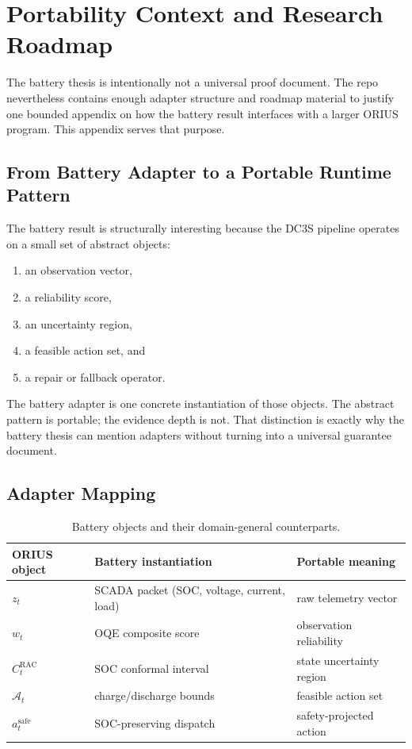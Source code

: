 \chapter{Portability Context and Research Roadmap}
\label{app:portability-roadmap}

The battery thesis is intentionally not a universal proof document.  The
repo nevertheless contains enough adapter structure and roadmap material to
justify one bounded appendix on how the battery result interfaces with a
larger ORIUS program.  This appendix serves that purpose.

\section{From Battery Adapter to a Portable Runtime Pattern}

The battery result is structurally interesting because the DC3S pipeline
operates on a small set of abstract objects:

\begin{enumerate}
  \item an observation vector,
  \item a reliability score,
  \item an uncertainty region,
  \item a feasible action set, and
  \item a repair or fallback operator.
\end{enumerate}

The battery adapter is one concrete instantiation of those objects.  The
abstract pattern is portable; the evidence depth is not.  That distinction is
exactly why the battery thesis can mention adapters without turning into a
universal guarantee document.

\section{Adapter Mapping}

\begin{table}[ht]
\centering
\caption{Battery objects and their domain-general counterparts.}
\label{tab:portable-adapter-map}
\begin{tabular}{lll}
\toprule
\textbf{ORIUS object} & \textbf{Battery instantiation} & \textbf{Portable meaning} \\
\midrule
$z_t$ & SCADA packet (SOC, voltage, current, load) & raw telemetry vector \\
$w_t$ & OQE composite score & observation reliability \\
$C_t^{\mathrm{RAC}}$ & SOC conformal interval & state uncertainty region \\
$\mathcal{A}_t$ & charge/discharge bounds & feasible action set \\
$a_t^{\mathrm{safe}}$ & SOC-preserving dispatch & safety-projected action \\
\bottomrule
\end{tabular}
\end{table}

